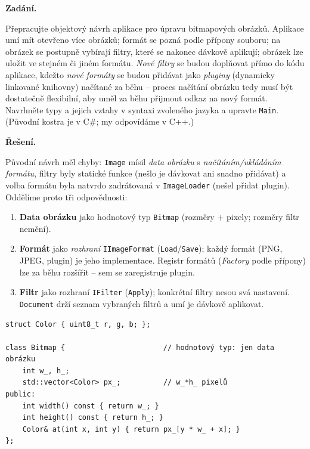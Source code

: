 \documentclass[11pt,a4paper]{article}
\begin{document}
\begin{priklad}
\par

\textbf{Zadání.}\par
Přepracujte objektový návrh aplikace pro úpravu bitmapových obrázků. Aplikace umí mít otevřeno více obrázků; formát se pozná podle přípony souboru; na obrázek se postupně vybírají filtry, které se nakonec dávkově aplikují; obrázek lze uložit ve stejném či jiném formátu. \emph{Nové filtry} se budou doplňovat přímo do kódu aplikace, kdežto \emph{nové formáty} se budou přidávat jako \emph{pluginy} (dynamicky linkované knihovny) načítané za běhu -- proces načítání obrázku tedy musí být dostatečně flexibilní, aby uměl za běhu přijmout odkaz na nový formát. Navrhněte typy a jejich vztahy v syntaxi zvoleného jazyka a upravte \texttt{Main}. (Původní kostra je v C\#; my odpovídáme v C++.)

\medskip
\textbf{Řešení.}\par
Původní návrh měl chyby: \texttt{Image} mísil \emph{data obrázku} s \emph{načítáním/ukládáním formátu}, filtry byly statické funkce (nešlo je dávkovat ani snadno přidávat) a volba formátu byla natvrdo zadrátovaná v \texttt{ImageLoader} (nešel přidat plugin). Oddělíme proto tři odpovědnosti:

\begin{enumerate}
  \item \textbf{Data obrázku} jako hodnotový typ \texttt{Bitmap} (rozměry + pixely; rozměry filtr nemění).
  \item \textbf{Formát} jako \emph{rozhraní} \texttt{IImageFormat} (\texttt{Load}/\texttt{Save}); každý formát (PNG, JPEG, plugin) je jeho implementace. Registr formátů (\emph{Factory} podle přípony) lze za běhu rozšířit -- sem se zaregistruje plugin.
  \item \textbf{Filtr} jako rozhraní \texttt{IFilter} (\texttt{Apply}); konkrétní filtry nesou svá nastavení. \texttt{Document} drží seznam vybraných filtrů a umí je dávkově aplikovat.
\end{enumerate}

\begin{lstlisting}[style=cpp]
struct Color { uint8_t r, g, b; };

class Bitmap {                       // hodnotový typ: jen data obrázku
    int w_, h_;
    std::vector<Color> px_;          // w_*h_ pixelů
public:
    int width() const { return w_; }
    int height() const { return h_; }
    Color& at(int x, int y) { return px_[y * w_ + x]; }
};


\end{lstlisting}
\end{priklad}
\end{document}
